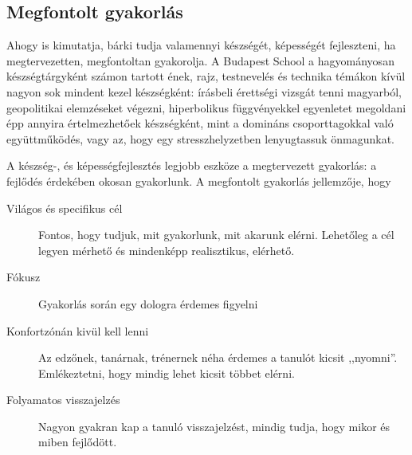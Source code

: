 \subsection{Megfontolt gyakorlás}
Ahogy \citep{ericsson2016peak} is kimutatja, bárki tudja valamennyi készségét, képességét fejleszteni, ha megtervezetten, megfontoltan gyakorolja. A Budapest School a hagyományosan készségtárgyként számon tartott ének, rajz, testnevelés és technika témákon kívül nagyon sok mindent kezel készségként: írásbeli érettségi vizsgát tenni magyarból, geopolitikai elemzéseket végezni, hiperbolikus függvényekkel egyenletet megoldani épp annyira értelmezhetőek készségként, mint a domináns csoporttagokkal való együttműködés, vagy az, hogy egy stresszhelyzetben lenyugtassuk önmagunkat.

A készség-, és képességfejlesztés legjobb eszköze a megtervezett gyakorlás: a fejlődés érdekében okosan gyakorlunk. A megfontolt gyakorlás jellemzője, hogy

\begin{description}
      \item[Világos és specifikus cél] Fontos, hogy tudjuk, mit gyakorlunk, mit
            akarunk elérni.  Lehetőleg a cél legyen mérhető és mindenképp realisztikus, elérhető.
      \item[Fókusz] Gyakorlás során egy dologra érdemes figyelni
      \item[Konfortzónán kivül kell lenni] Az edzőnek, tanárnak, trénernek
            néha érdemes a tanulót kicsit ,,nyomni''. Emlékeztetni, hogy mindig lehet kicsit többet elérni.
      \item[Folyamatos visszajelzés] Nagyon gyakran kap a tanuló visszajelzést,
            mindig tudja, hogy mikor és miben fejlődött.
\end{description}
